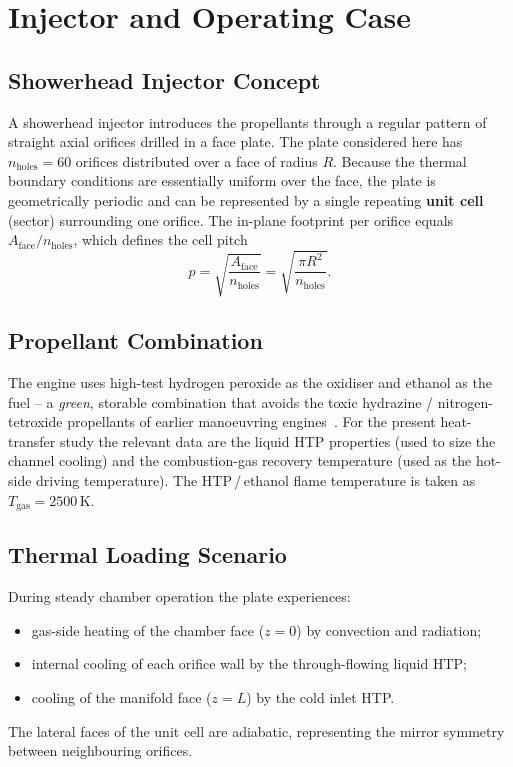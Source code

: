 \documentclass[11pt,a4paper]{article}
\begin{document}
\section{Injector and Operating Case}
\subsection{Showerhead Injector Concept}
A showerhead injector introduces the propellants through a regular pattern of
straight axial orifices drilled in a face plate. The plate considered here has
$n_\mathrm{holes}=60$ orifices distributed over a face of radius $R$. Because the
thermal boundary conditions are essentially uniform over the face, the plate is
geometrically periodic and can be represented by a single repeating
\textbf{unit cell} (sector) surrounding one orifice. The in-plane footprint per
orifice equals $A_\mathrm{face}/n_\mathrm{holes}$, which defines the cell pitch
\begin{equation}
  p = \sqrt{\frac{A_\mathrm{face}}{n_\mathrm{holes}}}
    = \sqrt{\frac{\pi R^2}{n_\mathrm{holes}}}.
  \label{eq:pitch}
\end{equation}

\subsection{Propellant Combination}
The engine uses high-test hydrogen peroxide as the oxidiser and ethanol as the
fuel -- a \emph{green}, storable combination that avoids the toxic hydrazine /
nitrogen-tetroxide propellants of earlier manoeuvring engines~\cite{ventura}.
For the present heat-transfer study the relevant data are the liquid HTP
properties (used to size the channel cooling) and the combustion-gas recovery
temperature (used as the hot-side driving temperature). The HTP\,/\,ethanol flame
temperature is taken as $T_\mathrm{gas}=2500\,$K.

\subsection{Thermal Loading Scenario}
During steady chamber operation the plate experiences:
\begin{itemize}[noitemsep]
  \item gas-side heating of the chamber face ($z=0$) by convection and radiation;
  \item internal cooling of each orifice wall by the through-flowing liquid HTP;
  \item cooling of the manifold face ($z=L$) by the cold inlet HTP.
\end{itemize}
The lateral faces of the unit cell are adiabatic, representing the mirror
symmetry between neighbouring orifices.
\end{document}
